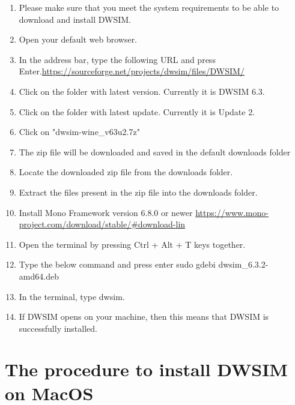 \documentclass[12pt,a4paper]{article}
\begin{document}
\begin{enumerate}
\item Please make sure that you meet the system requirements to be able to download and install DWSIM.
\item Open your default web browser.
\item In the address bar, type the following URL and press Enter.\newline \url{https://sourceforge.net/projects/dwsim/files/DWSIM/}

\item Click on the folder with latest version. Currently it is DWSIM 6.3.

\item Click on the folder with latest update. Currently it is Update 2.
\item Click on "dwsim-wine\_v63u2.7z"
\item The zip file will be downloaded and saved in the default downloads folder
\item Locate the downloaded zip file from the downloads folder.
\item Extract the files present in the zip file into the downloads folder.
\item Install Mono Framework version 6.8.0 or newer
\newline \url{https://www.mono-project.com/download/stable/#download-lin}

\item Open the terminal by pressing Ctrl + Alt + T keys together.

\item Type the below command and press enter
\newline sudo gdebi dwsim\_6.3.2-amd64.deb

\item In the terminal, type dwsim.
\item If DWSIM opens on your machine, then this means that DWSIM is successfully installed.

\end{enumerate}

\section{The procedure to install DWSIM on MacOS}
\end{document}
